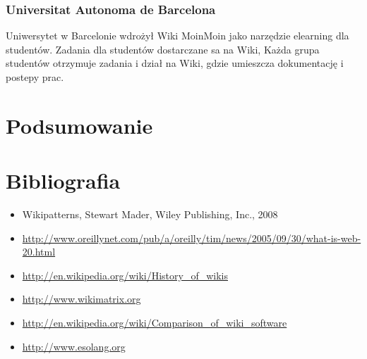 \documentclass{article}
\begin{document}
\subsubsection{Universitat Autonoma de Barcelona } 

Uniwersytet w Barcelonie wdrożył Wiki MoinMoin jako narzędzie elearning dla studentów.
Zadania dla studentów dostarczane sa na Wiki, Każda grupa studentów otrzymuje zadania i dział na Wiki, gdzie umieszcza dokumentację i postepy prac.

\newpage
\section{Podsumowanie}

\newpage
\section{Bibliografia}
	\begin{itemize}
		\item 	Wikipatterns, Stewart Mader, Wiley Publishing, Inc., 2008
 		\item \url{http://www.oreillynet.com/pub/a/oreilly/tim/news/2005/09/30/what-is-web-20.html}
		\item \url{http://en.wikipedia.org/wiki/History_of_wikis}
		\item \url{http://www.wikimatrix.org}
		\item \url{http://en.wikipedia.org/wiki/Comparison_of_wiki_software}
		\item \url{http://www.esolang.org}
	\end{itemize}
\end{document}
